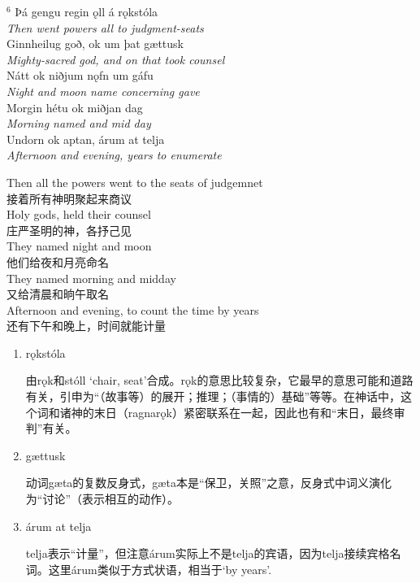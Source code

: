\begin{paracol}{2}
    \noindent
    $^6 $ Þá gengu regin ǫll á rǫkstóla\\
    \textit{Then went powers all to judgment-seats}\\
    Ginnheilug goð, ok um þat gættusk\\
    \textit{Mighty-sacred god, and on that took counsel}\\
    Nátt ok niðjum nǫfn um gáfu\\
    \textit{Night and moon name concerning gave}\\
    Morgin hétu ok miðjan dag\\
    \textit{Morning named and mid day}\\
    Undorn ok aptan, árum at telja\\
    \textit{Afternoon and evening, years to enumerate}\\

    \switchcolumn

    \noindent
    Then all the powers went to the seats of judgemnet\\
    接着所有神明聚起来商议\\
    Holy gods, held their counsel\\
    庄严圣明的神，各抒己见\\
    They named night and moon\\
    他们给夜和月亮命名\\
    They named morning and midday\\
    又给清晨和晌午取名\\
    Afternoon and evening, to count the time by years\\
    还有下午和晚上，时间就能计量\\

\end{paracol}
\begin{grammar*}{}
    \begin{enumerate}[leftmargin=*]

        \item rǫkstóla

              由rǫk和stóll `chair, seat'合成。rǫk的意思比较复杂，它最早的意思可能和道路有关，引申为“（故事等）的展开；推理；（事情的）基础”等等。在神话中，这个词和诸神的末日（ragnarǫk）紧密联系在一起，因此也有和“末日，最终审判”有关。

        \item gættusk

              动词gæta的复数反身式，gæta本是“保卫，关照”之意，反身式中词义演化为“讨论”（表示相互的动作）。

        \item árum at telja

              telja表示“计量”，但注意árum实际上不是telja的宾语，因为telja接续宾格名词。这里árum类似于方式状语，相当于`by years'.
    \end{enumerate}
\end{grammar*}
\hspace*{\fill}\\ %

